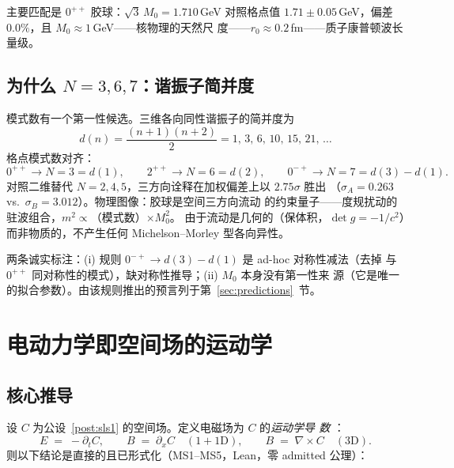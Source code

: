 \documentclass[aps,prd,preprint,superscriptaddress,amsmath,amssymb]{revtex4-2}
\begin{document}
主要匹配是 $0^{++}$ 胶球：$\sqrt{3}\,M_0=1.710$\,GeV 对照格点值
$1.71\pm0.05$\,GeV，偏差 $0.0\%$，且 $M_0\approx 1$\,GeV——核物理的天然尺
度——$r_0\approx0.2$\,fm——质子康普顿波长量级。

\subsection{为什么 $N=3,6,7$：谐振子简并度}

模式数有一个第一性候选。三维各向同性谐振子的简并度为
\begin{equation}
d(n) = \frac{(n+1)(n+2)}{2} = 1,\,3,\,6,\,10,\,15,\,21,\,\ldots
\end{equation}
格点模式数对齐：
\begin{equation}
0^{++}\to N=3=d(1), \qquad
2^{++}\to N=6=d(2), \qquad
0^{-+}\to N=7=d(3)-d(1).
\end{equation}
对照二维替代 $N=2,4,5$，三方向诠释在加权偏差上以 $2.75\sigma$ 胜出
（$\sigma_A=0.263$ vs.\ $\sigma_B=3.012$）。物理图像：胶球是空间三方向流动
的约束量子——度规扰动的驻波组合，$m^2\propto$（模式数）$\times M_0^2$。
由于流动是几何的（保体积，$\det g=-1/c^2$）而非物质的，不产生任何
Michelson--Morley 型各向异性。

两条诚实标注：(i) 规则 $0^{-+}\to d(3)-d(1)$ 是 ad-hoc 对称性减法（去掉
与 $0^{++}$ 同对称性的模式），缺对称性推导；(ii) $M_0$ 本身没有第一性来
源（它是唯一的拟合参数）。由该规则推出的预言列于第~\ref{sec:predictions}~节。

\section{电动力学即空间场的运动学}\label{sec:em}

\subsection{核心推导}

设 $C$ 为公设~\ref{post:sls1} 的空间场。定义电磁场为 $C$ 的\emph{运动学导
数} \cite{ProjectionPhysics-MS}：
\begin{equation}
\label{eq:kinematic}
E \;=\; -\partial_t C , \qquad
B \;=\; \partial_x C \quad (1{+}1\mathrm{D}), \qquad
B \;=\; \nabla\times C \quad (3\mathrm{D}).
\end{equation}
则以下结论是直接的且已形式化（MS1--MS5，Lean，零 admitted 公理）：
\end{document}
